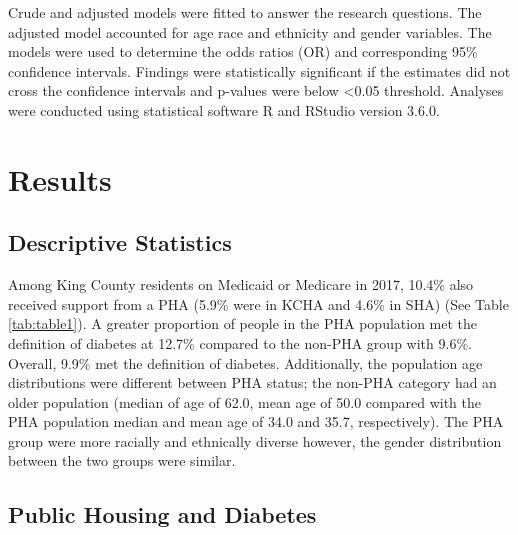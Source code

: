 \documentclass [11pt, proquest] {uwthesis}[2015/03/03]
\begin{document}
Crude and adjusted models were fitted to answer the research questions.
The adjusted model accounted for age race and ethnicity and gender
variables. The models were used to determine the odds ratios (OR) and
corresponding 95\% confidence intervals. Findings were statistically
significant if the estimates did not cross the confidence intervals and
p-values were below \textless{}0.05 threshold. Analyses were conducted
using statistical software R and RStudio version 3.6.0.

\chapter{Results}\label{ref-labels}

\section{Descriptive Statistics}\label{descriptive-statistics}

Among King County residents on Medicaid or Medicare in 2017, 10.4\% also
received support from a PHA (5.9\% were in KCHA and 4.6\% in SHA) (See
Table \ref{tab:table1}). A greater proportion of people in the PHA
population met the definition of diabetes at 12.7\% compared to the
non-PHA group with 9.6\%. Overall, 9.9\% met the definition of diabetes.
Additionally, the population age distributions were different between
PHA status; the non-PHA category had an older population (median of age
of 62.0, mean age of 50.0 compared with the PHA population median and
mean age of 34.0 and 35.7, respectively). The PHA group were more
racially and ethnically diverse however, the gender distribution between
the two groups were similar.

\section{Public Housing and Diabetes}\label{public-housing-and-diabetes}
\end{document}
